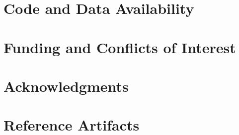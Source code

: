 \documentclass[11pt]{article}
\begin{document}
\section*{Code and Data Availability}


\section*{Funding and Conflicts of Interest}


\section*{Acknowledgments}





\clearpage
\appendix
\section{Reference Artifacts}

\end{document}

